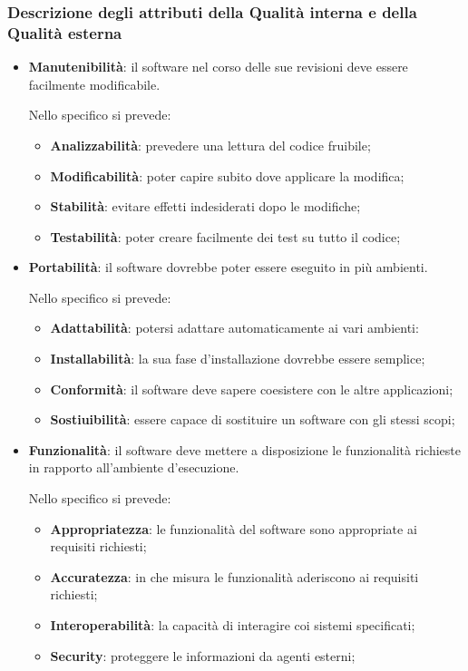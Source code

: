 		\subsubsection{Descrizione degli attributi della Qualità interna e della Qualità esterna}
		\begin{itemize}
			\item \textbf{Manutenibilità}: il software nel corso delle sue revisioni deve essere facilmente modificabile.
			
			Nello specifico si prevede:
			
			\begin{itemize}
				\item \textbf{Analizzabilità}: prevedere una lettura del codice fruibile;
				\item \textbf{Modificabilità}: poter capire subito dove applicare la modifica;
				\item \textbf{Stabilità}: evitare effetti indesiderati dopo le modifiche;
				\item \textbf{Testabilità}: poter creare facilmente dei test su tutto il codice;
			\end{itemize}
		
			\item \textbf{Portabilità}: il software dovrebbe poter essere eseguito in più ambienti.
			
			Nello specifico si prevede:
			
			\begin{itemize}
				\item \textbf{Adattabilità}: potersi adattare automaticamente ai vari ambienti:
				\item \textbf{Installabilità}: la sua fase d'installazione dovrebbe essere semplice;
				\item \textbf{Conformità}: il software deve sapere coesistere con le altre applicazioni;
				\item \textbf{Sostiuibilità}: essere capace di sostituire un software con gli stessi scopi;
			\end{itemize}
		
			\item \textbf{Funzionalità}: il software deve mettere a disposizione le funzionalità richieste in rapporto all'ambiente d'esecuzione.
			
			Nello specifico si prevede:
			
			\begin{itemize}
				\item \textbf{Appropriatezza}: le funzionalità del software sono appropriate ai requisiti richiesti;
				\item \textbf{Accuratezza}: in che misura le funzionalità aderiscono ai requisiti richiesti;
				\item \textbf{Interoperabilità}: la capacità di interagire coi sistemi specificati;
				\item \textbf{Security}: proteggere le informazioni da agenti esterni;
			\end{itemize}
		

\end{itemize}

